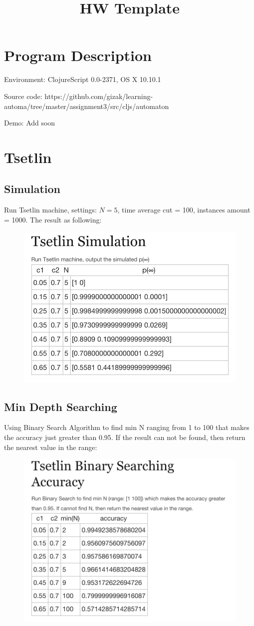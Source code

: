 \documentclass[11pt,letterpaper]{article}
\title{HW Template}
\begin{document}
\section{Program Description}
	\begin{compactitem}
	\item   Environment: ClojureScript 0.0-2371, OS X 10.10.1\\
	\item	Source code: https://github.com/gizak/learning-automa/tree/master/assignment3/src/cljs/automaton\\
	\item	Demo: Add soon
	\end{compactitem}


\section{Tsetlin}
\subsection{Simulation}
Run Tsetlin machine, settings: $N=5$, time average cut = 100, instances amount = 1000. The result as following:

\begin{figure}[H]
\includegraphics[width=.55\linewidth]{1a}
\end{figure}

\subsection{Min Depth Searching}
Using Binary Search Algorithm to find min N ranging from 1 to 100 that makes the accuracy just greater than 0.95. If the result can not be found, then return the nearest value in the range:

\begin{figure}[H]
\includegraphics[width=.55\linewidth]{1b}
\end{figure}
\end{document}
